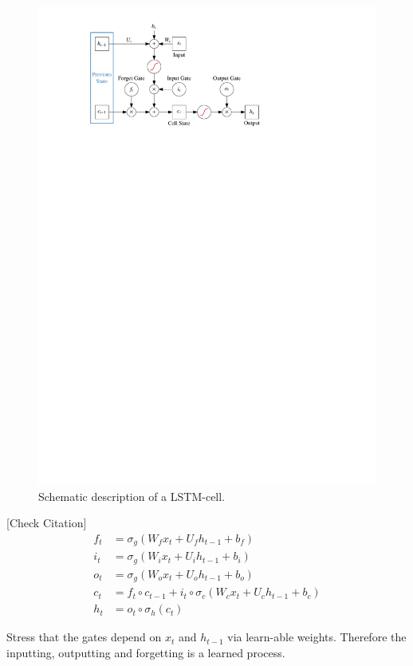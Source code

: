 \begin{figure}[t]
  \centering
  \includegraphics{./figures/theory/LSTM.pdf}
  \caption{Schematic description of a LSTM-cell.}
  \label{fig:schematic_lstm}
\end{figure}

[Check Citation]\cite{lstm}
\begin{align*}
  f_t &= \sigma_g( W_f x_t + U_f h_{t-1} + b_f) \\
  i_t &= \sigma_g( W_i x_t + U_i h_{t-1} + b_i) \\
  o_t &= \sigma_g( W_o x_t + U_o h_{t-1} + b_o) \\
  c_t &= f_t \circ c_{t-1} + i_t \circ \sigma_c(W_c x_t + U_c h_{t-1} + b_c) \\
  h_t &= o_t \circ \sigma_h(c_t)
\end{align*}

Stress that the gates depend on $x_t$ and $h_{t-1}$ via learn-able weights.
Therefore the inputting, outputting and forgetting is a learned process.

